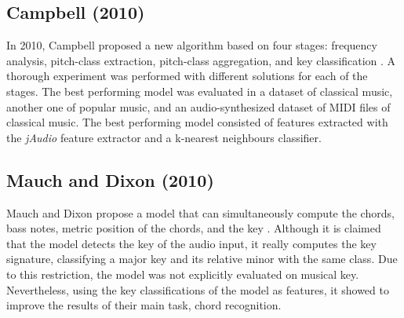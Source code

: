 \subsection{Campbell (2010)}
In 2010, Campbell proposed a new algorithm based on four stages: frequency analysis, pitch-class extraction, pitch-class aggregation, and key classification \cite{campbell2010automatic}. A thorough experiment was performed with different solutions for each of the stages. The best performing model was evaluated in a dataset of classical music, another one of popular music, and an audio-synthesized dataset of MIDI files of classical music. The best performing model consisted of features extracted with the \emph{jAudio} feature extractor and a k-nearest neighbours classifier.

\subsection{Mauch and Dixon (2010)}
Mauch and Dixon propose a model that can simultaneously compute the chords, bass notes, metric position of the chords, and the key \cite{mauch2010simultaneous}. Although it is claimed that the model detects the key of the audio input, it really computes the key signature, classifying a major key and its relative minor with the same class. Due to this restriction, the model was not explicitly evaluated on musical key. Nevertheless, using the key classifications of the model as features, it showed to improve the results of their main task, chord recognition.






